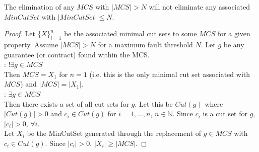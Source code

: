 \begin{theorem} 
The elimination of any $MCS$ with $|MCS| > N$ will not eliminate any associated $MinCutSet$ with $|MinCutSet| \leq N$. \\

\begin{proof} 
Let $\{X\}_{i=1}^n$ be the associated minimal cut sets to some $MCS$ for a given property. Assume $|MCS| > N$ for a maximum fault threshold $N$.  Let $g$ be any guarantee (or contract) found within the MCS. \\

: $!\exists g \in MCS$\\
Then $MCS = X_1$ for $n = 1$ (i.e. this is the only minimal cut set associated with $MCS$) and $|MCS| = |X_1|$.\\

: $\exists g \in MCS$\\
Then there exists a set of all cut sets for $g$. Let this be $Cut(g)$ where $|Cut(g)| > 0$ and $c_i \in Cut(g)$ for $i = 1,...,n$, $n \in \mathbb{N}$. Since $c_i$ is a cut set for $g$, $|c_i| > 0$, $\forall i$. \\

Let $X_i$ be the MinCutSet generated through the replacement of $g \in MCS$ with $c_i \in Cut(g)$. Since $|c_i| > 0$, $|X_i| \geq |MCS|$. 

\end{proof}
\end{theorem}





































